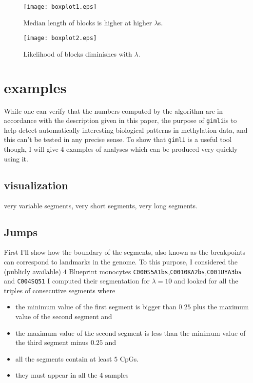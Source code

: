 \documentclass[12pt]{amsart}
\newcommand{\gimli}{\texttt{gimli}}
\begin{document}
\begin{figure}\label{fig4}
\texttt{[image: boxplot1.eps]}
\caption{Median length of blocks is higher at higher $\lambda$s.}
\end{figure}

\begin{figure}\label{fig5}
\texttt{[image: boxplot2.eps]}
\caption{Likelihood of blocks diminishes with $\lambda$.}
\end{figure}

\section{examples}

While one can verify that the numbers computed by the algorithm are in 
accordance with the description
given in this paper, the purpose of \gimli is to help 
detect automatically interesting
biological patterns in methylation data, and this can't be tested in any 
precise sense. To show that \gimli{} is a useful tool
though, I will give $4$ examples of analyses which can be produced very quickly
using it. 

\subsection{visualization}

very variable segments, very short segments, very long segments.


\subsection{Jumps}

First I'll show how the boundary of the segments, also known as the breakpoints
can correspond to landmarks in the genome. To this purpose, I considered the (publicly available)
$4$ Blueprint monocytes \verb=C000S5A1bs=,\verb=C0010KA2bs=,\verb=C001UYA3bs= and \verb=C004SQ51= 
I computed their segmentation for $\lambda=10$ and looked for all the triples of consecutive segments
where 
\begin{itemize}
\item{} the minimum value of the first segment is bigger than $0.25$ plus the maximum value
of the second segment and
\item{} the maximum value of the second segment is less than the minimum value of the third
segment minus $0.25$ and
\item{} all the segments contain at least $5$ CpGs.
\item{} they must appear in all the 4 samples
\end{itemize}
\end{document}
